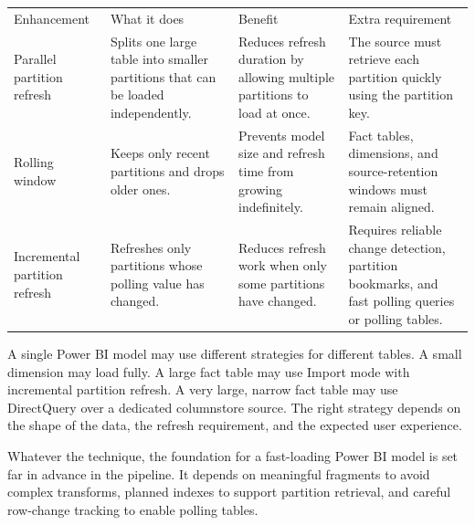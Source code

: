 \documentclass[10pt,openany,10pt]{book}
\newcounter{none}
\let\podeToprule\toprule
\let\podeMidrule\midrule
\let\podeBottomrule\bottomrule
\renewcommand{\toprule}{\arrayrulecolor{pbiGrid}\podeToprule}
\renewcommand{\midrule}{\arrayrulecolor{pbiGrid}\podeMidrule}
\renewcommand{\bottomrule}{\arrayrulecolor{pbiGrid}\podeBottomrule}
\begin{document}
{\def\LTcaptype{none} %
\begin{longtable}[]{@{}
  >{\raggedright\arraybackslash}p{}
  >{\raggedright\arraybackslash}p{}
  >{\raggedright\arraybackslash}p{}
  >{\raggedright\arraybackslash}p{}@{}}
\toprule\noalign{}
\begin{minipage}[b]{\linewidth}\raggedright
Enhancement
\end{minipage} & \begin{minipage}[b]{\linewidth}\raggedright
What it does
\end{minipage} & \begin{minipage}[b]{\linewidth}\raggedright
Benefit
\end{minipage} & \begin{minipage}[b]{\linewidth}\raggedright
Extra requirement
\end{minipage} \\
\midrule\noalign{}
\endhead
\bottomrule\noalign{}
\endlastfoot
Parallel partition refresh & Splits one large table into smaller
partitions that can be loaded independently. & Reduces refresh duration
by allowing multiple partitions to load at once. & The source must
retrieve each partition quickly using the partition key. \\
Rolling window & Keeps only recent partitions and drops older ones. &
Prevents model size and refresh time from growing indefinitely. & Fact
tables, dimensions, and source-retention windows must remain aligned. \\
Incremental partition refresh & Refreshes only partitions whose polling
value has changed. & Reduces refresh work when only some partitions have
changed. & Requires reliable change detection, partition bookmarks, and
fast polling queries or polling tables. \\
\end{longtable}
}

A single Power BI model may use different strategies for different
tables. A small dimension may load fully. A large fact table may use
Import mode with incremental partition refresh. A very large, narrow
fact table may use DirectQuery over a dedicated columnstore source. The
right strategy depends on the shape of the data, the refresh
requirement, and the expected user experience.

Whatever the technique, the foundation for a fast-loading Power BI model
is set far in advance in the pipeline. It depends on meaningful
fragments to avoid complex transforms, planned indexes to support
partition retrieval, and careful row-change tracking to enable polling
tables.
\end{document}
